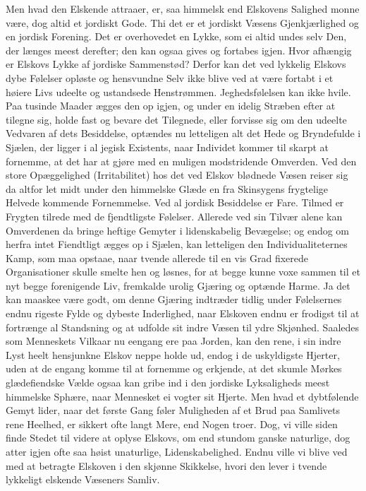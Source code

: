 \documentclass[12pt,a4paper]{book}
\newcommand{\apage}[1]{\marginnote{\footnotesize\textit{[#1]}}}
\begin{document}
Men hvad den Elskende attraaer, er, saa himmelsk end Elskovens Salighed
monne være, dog altid et jordiskt Gode. Thi det er et jordiskt Væsens
Gjenkjærlighed og en jordisk Forening. Det er overhovedet en Lykke, som
ei altid undes selv Den, der længes meest derefter; den kan ogsaa gives
og fortabes igjen. Hvor afhængig er Elskovs Lykke af jordiske
Sammenstød? Derfor kan det ved lykkelig Elskovs dybe Følelser opløste
og hensvundne Selv ikke blive ved at være fortabt i et høiere Livs
udeelte og ustandsede Henstrømmen. Jeghedsfølelsen kan ikke hvile. Paa
tusinde Maader ægges den op igjen, og under en idelig Stræben efter at
tilegne sig, holde fast og bevare det Tilegnede, eller forvisse sig om
den udeelte Vedvaren af dets Besiddelse, optændes nu letteligen alt det
Hede og Bryndefulde i Sjælen, der ligger i al jegisk Existents, naar
Individet kommer til skarpt at fornemme, at det har at gjøre med en
muligen modstridende Omverden. Ved den store Opæggelighed
(Irritabilitet) hos det ved Elskov blødnede Væsen reiser sig da altfor
let midt under den himmelske Glæde en fra Skinsygens frygtelige Helvede \apage{31}
kommende Fornemmelse. Ved al jordisk Besiddelse er Fare. Tilmed er
Frygten tilrede med de fjendtligste Følelser. Allerede ved sin Tilvær
alene kan Omverdenen da bringe heftige Gemyter i lidenskabelig
Bevægelse; og endog om herfra intet Fiendtligt ægges op i Sjælen, kan
letteligen den Individualiteternes Kamp, som maa opstaae, naar tvende
allerede til en vis Grad fixerede Organisationer skulle smelte hen og
løsnes, for at begge kunne voxe sammen til et nyt begge forenigende
Liv, fremkalde urolig Gjæring og optænde Harme. Ja det kan maaskee være
godt, om denne Gjæring indtræder tidlig under Følelsernes endnu rigeste
Fylde og dybeste Inderlighed, naar Elskoven endnu er frodigst til at
fortrænge al Standsning og at udfolde sit indre Væsen til ydre
Skjønhed. Saaledes som Menneskets Vilkaar nu eengang ere paa Jorden,
kan den rene, i sin indre Lyst heelt hensjunkne Elskov neppe holde ud,
endog i de uskyldigste Hjerter, uden at de engang komme til at fornemme
og erkjende, at det skumle Mørkes glædefiendske Vælde ogsaa kan gribe
ind i den jordiske Lyksaligheds meest himmelske Sphære, naar Mennesket
ei vogter sit Hjerte. Men hvad et dybtfølende Gemyt lider, naar det
første Gang føler Muligheden af et Brud paa Samlivets rene Heelhed, er
sikkert ofte langt Mere, end Nogen troer. Dog, vi ville siden finde
Stedet til videre at oplyse Elskovs, om end stundom ganske naturlige,
dog atter igjen ofte saa høist unaturlige, Lidenskabelighed. Endnu ville
vi blive ved \apage{32} med at betragte Elskoven i den skjønne Skikkelse, hvori
den lever i tvende lykkeligt elskende Væseners Samliv.
\end{document}
